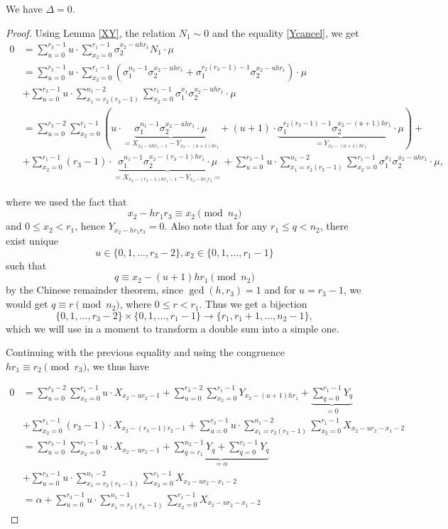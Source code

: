 \begin{lemma}
We have $\Delta=0$.
\end{lemma}
\begin{proof}
Using Lemma \ref{XY}, the relation $N_1\sim 0$ and the equality \eqref{Ycancel},
we get
\begin{align*}
0&= \sum_{u=0}^{r_3-1}u\cdot \sum _{x_2=0}^{r_1-1}\sigma_2^{x_2-uh r_1}N_1\cdot \mu\\
&=\sum_{u=0}^{r_3-1}u\cdot \sum _{x_2=0}^{r_1-1} \left( \sigma_1^{n_1-1}\sigma_2^{x_2-uh r_1}+\sigma_1^{r_2(r_3-1)-1}\sigma_2^{x_2-uh r_1}\right)\cdot \mu\\
&+\sum_{u=0}^{r_3-1}u\cdot \sum_{x_1=r_2(r_3-1)}^{n_1-2}\sum _{x_2=0}^{r_1-1}\sigma_1^{x_1}\sigma_2^{x_2-uh r_1}\cdot \mu\\
&=\sum_{u=0}^{r_3-2} \sum _{x_2=0}^{r_1-1} \left( u\cdot\underbrace{\sigma_1^{n_1-1}\sigma_2^{x_2-uh r_1}\cdot \mu}_{=X_{x_2-uhr_1-1}-Y_{x_2-(u+1)hr_1}}+(u+1)\cdot\underbrace{\sigma_1^{r_2(r_3-1)-1}\sigma_2^{x_2-(u+1)h r_1}\cdot \mu}_{=Y_{x_2-(u+1)h r_1}}\right)+\\
&+\sum_{x_2=0}^{r_1-1}(r_3-1)\cdot \underbrace{\sigma_1^{n_1-1}\sigma_2^{x_2-(r_3-1)h r_1}\cdot \mu}_{=
X_{x_2-(r_3-1)hr_1-1}-Y_{x_2-hr_1r_3}=
}+\sum_{u=0}^{r_3-1}u\cdot \sum_{x_1=r_2(r_3-1)}^{n_1-2}\sum _{x_2=0}^{r_1-1}\sigma_1^{x_1}\sigma_2^{x_2-uh r_1}\cdot \mu,
\end{align*}

where we used the fact that $$x_2-hr_1r_3\equiv x_2\pmod{n_2}$$  and $0\leq x_2< r_1$, hence $Y_{x_2-hr_1r_3}=0$. Also note that for any $r_1\leq q<n_2$, there exist unique $$u\in\{0,1,\dots,r_3-2\},x_2\in\{0,1,\dots,r_1-1\}$$ such that $$q\equiv x_2-(u+1)hr_1 \pmod{n_2}$$ by the Chinese remainder theorem, since $\gcd(h,r_3)=1$ and for $u=r_3-1$, we would get  $q\equiv r\pmod{n_2}$, where $0\leq r<r_1$. Thus we get a bijection $$\{0,1,\dots,r_3-2\}\times\{0,1,\dots,r_1-1\}\to \{r_1,r_1+1,\dots,n_2-1\},$$ which we will use in a moment to transform a double sum into a simple one.

Continuing with the previous equality and using the congruence $hr_1\equiv r_2\pmod{r_3}$, we thus have

\begin{align*}
0&=\sum_{u=0}^{r_3-2} \sum _{x_2=0}^{r_1-1} u\cdot X_{x_2-ur_2-1}+\sum_{u=0}^{r_3-2} \sum _{x_2=0}^{r_1-1} Y_{x_2-(u+1)hr_1}+\underbrace{\sum_{q=0}^{r_1-1}Y_{q}}_{=0}\\
&+\sum_{x_2=0}^{r_1-1}(r_3-1)\cdot X_{x_2-(r_3-1)r_2-1}+\sum_{u=0}^{r_3-1}u\cdot \sum_{x_1=r_2(r_3-1)}^{n_1-2}\sum _{x_2=0}^{r_1-1}X_{x_2-ur_2-x_1-2}\\
&=\sum_{u=0}^{r_3-1} \sum _{x_2=0}^{r_1-1} u\cdot X_{x_2-ur_2-1}+\underbrace{\sum_{q=r_1}^{n_2-1} Y_{q}+\sum_{q=0}^{r_1-1}Y_{q}}_{=\alpha}\\
&+\sum_{u=0}^{r_3-1}u\cdot \sum_{x_1=r_2(r_3-1)}^{n_1-2}\sum _{x_2=0}^{r_1-1}X_{x_2-ur_2-x_1-2}\\
&=\alpha+\sum_{u=0}^{r_3-1}u\cdot \sum_{x_1=r_2(r_3-1)}^{n_1-1}\sum _{x_2=0}^{r_1-1}X_{x_2-ur_2-x_1-2}
\end{align*}


\end{proof}
